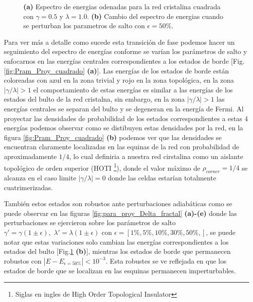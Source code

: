 \begin{figure}[h!]
\begin{subfigure}[b!]{0.5 \textwidth}
    \end{subfigure}\hspace*{-0.9em}
       \caption{\textbf{(a)} Espectro de energias odenadas para la red cristalina cuadrada con $\gamma = 0.5$ y $\lambda = 1.0$. \textbf{(b)} Cambio del espectro de energias cuando se perturban los parametros de salto con $\epsilon = 50\%$.}
       \label{fig:spectre_square_epsi}
\end{figure}


Para ver más a detalle como sucede esta transición de fase podemos hacer un seguimiento del espectro de energías conforme se varían los parámetros de salto y enfocarnos en las energías centrales correspondientes a los estados de borde [Fig.\ref{fig:Pram_Proy_cuadrado} \textbf{(a)}]. Las energías de los estados de borde están coloreadas con azul en la zona trivial y rojo en la zona topológica, en la zona $|\gamma/\lambda|>1$ el comportamiento de estas energías es similar a las energías de los estados del bulto de la red cristalna, sin embargo, en la zona $|\gamma/\lambda|>1$ las energías centrales se separan del bulto y se degeneran en la energía de Fermi. Al proyectar las densidades de probabilidad de los estados correspondientes a estas 4 energías podemos observar como se distibuyen estas densidades por la red, en la figura \ref{fig:Pram_Proy_cuadrado} \textbf{(b)} podemos ver que las densidades se encuentran claramente localizadas en las equinas de la red con probabilidad de aproximadamente $1/4$, lo cual definiria a nuestra red cirstalina como un aislante topológico de orden superior (HOTI \footnote{Siglas en ingles de High Order Topological Insulator}), donde el valor máximo de $\rho_{corner} = 1/4$ se alcanza en el caso limite $|\gamma/\lambda| = 0$ donde las celdas estarían totalmente cuatrimerizadas.




También estos estados son robustos ante perturbaciones adiabáticas como se puede observar en las figuras \ref{fig:para_proy_Delta_fractal} \textbf{(a)-(e)} donde las perturbaciones se ejercieron sobre los parámetros de salto $\gamma' = \gamma( 1 \pm \epsilon) ,\, \, \lambda' = \lambda( 1 \pm \epsilon)$ con $\epsilon = [1\%, 5\%, 10\%,30\%,50\%,]$, se puede notar que estas variaciones solo cambian las energías correspondientes a los estados del bulto [Fig.\ref{fig:spectre_square_epsi} \textbf{(b)}], mientras los estados de borde que permanecen robustos con $|E - E_{\epsilon = 50\%}| < 10^{-3}$. Esta robustes se ve reflejada en que los estados de borde que se localizan en las esquinas permanecen imperturbables.



